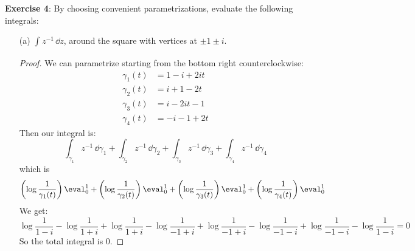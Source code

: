 \documentclass{article}
\begin{document}
\textbf{Exercise 4}: By choosing convenient parametrizations, evaluate the following integrals:
    \begin{itemize}
        \item [(a)] $\int_{}^{} z^{-1} \, \dd{z} $, around the square with vertices at $\pm 1 \pm i$.
            \begin{proof}
                We can parametrize starting from the bottom right counterclockwise:
                    \begin{align*}
                        \gamma_{1}(t) &= 1 - i + 2it \\
                        \gamma_{2}(t) &= i + 1 - 2t  \\
                        \gamma_{3}(t) &= i - 2it - 1 \\
                        \gamma_{4}(t) &= -i - 1 + 2t   
                    \end{align*}
                Then our integral is:
                    \begin{equation*}
                        \int_{\gamma_{1}}^{} z^{-1} \, \dd{\gamma_{1}} + \int_{\gamma_{2}}^{} z^{-1} \, \dd{\gamma_{2}} + \int_{\gamma_{3}}^{} z^{-1} \, \dd{\gamma_{3}}  + \int_{\gamma_{4}}^{} z^{-1} \, \dd{\gamma_{4}}
                    \end{equation*}
                which is 
                    \begin{equation*}
                        \left(\log{\dfrac{1}{\gamma_{1}(t)}}\right)\eval_{0}^{1} + \left(\log{\dfrac{1}{\gamma_{2}(t)}}\right)\eval_{0}^{1} + \left(\log{\dfrac{1}{\gamma_{3}(t)}}\right)\eval_{0}^{1} + \left(\log{\dfrac{1}{\gamma_{4}(t)}}\right)\eval_{0}^{1} 
                    \end{equation*}
                We get:
                    \begin{equation*}
                        \log{\dfrac{1}{1 - i}} - \log{\dfrac{1}{1 + i}} + \log{\dfrac{1}{1 + i}} - \log{\dfrac{1}{-1 + i}} + \log{\dfrac{1}{-1 + i}} - \log{\dfrac{1}{-1 - i}} + \log{\dfrac{1}{-1 - i}} - \log{\dfrac{1}{1 - i}} = 0 
                    \end{equation*}
                So the total integral is $0$.
            \end{proof}


\end{itemize}
\end{document}
